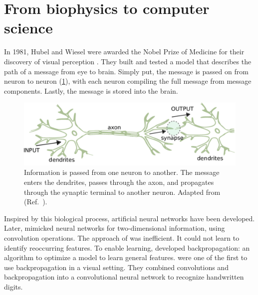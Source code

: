 \section[From biophysics to computer science]{From biophysics to computer science}

In 1981, Hubel and Wiesel were awarded the Nobel Prize of Medicine for their discovery of visual perception .
They built and tested a model that describes the path of a message from eye to brain.
Simply put, the message is passed on from neuron to neuron (\cref{fig:synapse}), with each neuron compiling the full message from message components.
Lastly, the message is stored into the brain.

\begin{figure}
    \centering
    \includegraphics[width=\linewidth]{ANN/images/neural-network.png}
    \caption[Two neurons exchanging information]{
        Information is passed from one neuron to another.
        The message enters the dendrites, passes through the axon, and propagates through the synaptic terminal to another neuron.
        Adapted from  (Ref.~\cite{Gerstner2002}).
    }
    \label{fig:synapse}
\end{figure}

Inspired by this biological process, artificial neural networks have been developed.
Later, \citeauthor{Fukushima1980}  mimicked neural networks for two-dimensional information, using convolution operations.
The approach of \citeauthor{Fukushima1980} was inefficient.
It could not learn to identify reoccurring features.
To enable learning, \citeauthor{Rumelhart1986}  developed backpropagation: an algorithm to optimize a model to learn general features.
\citeauthor{LeCun1990}  were one of the first to use backpropagation in a visual setting.
They combined convolutions and backpropagation into a convolutional neural network to recognize handwritten digits.

